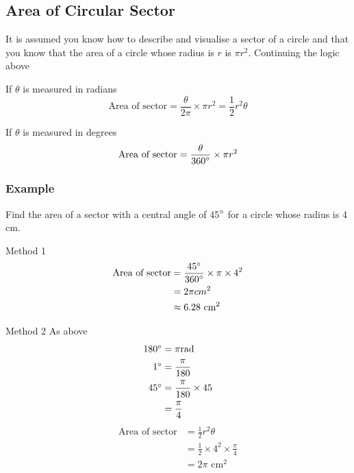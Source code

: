 \subsection{Area of Circular Sector}
It is assumed you know how to describe and visualise a sector of a circle and that you know that the area of a circle whose radius is $r$ is $\pi  r^{2}$. Continuing the logic above 

If $\theta $ is measured in radians
\begin{equation*}\text{Area of sector} =\frac{\theta }{2 \pi } \times \pi  r^{2} =\frac{1}{2} r^{2} \theta 
\end{equation*}

If $\theta $ is measured in degrees
\begin{equation*}\text{Area of sector} =\frac{\theta }{360 \mbox{{\ensuremath{{}^\circ}}}} \times \pi  r^{2}
\end{equation*}

\subsubsection{Example}
Find the area of a sector with a central angle of 45$\mbox{{\ensuremath{{}^\circ}}}$ for a circle whose radius is 4 $\mbox{cm}$. 

Method 1
\begin{align*}\text{Area of sector} &  =  \frac{45 \mbox{{\ensuremath{{}^\circ}}}}{360 \mbox{{\ensuremath{{}^\circ}}}} \times \pi  \times 4^{2} \\
 &  =  2 \pi \text{}cm^{2} \\
 &  \approx   6.28\text{ cm}^{2}\end{align*}

Method 2 As above
\begin{align*}180 \mbox{{\ensuremath{{}^\circ}}} &  =  \pi \text{}\mbox{rad} \\
1 \mbox{{\ensuremath{{}^\circ}}} &  =  \frac{\pi }{180} \\
45 \mbox{{\ensuremath{{}^\circ}}} &  =  \frac{\pi }{180} \times 45 \\
 &  =  \frac{\pi }{4}\end{align*}
\begin{align*}\text{Area of sector} &  =  \frac{1}{2} r^{2} \theta  \\
 &  =  \frac{1}{2} \times 4^{2} \times \frac{\pi }{4} \\
 &  =  2 \pi \text{ cm}^{2}\end{align*}



